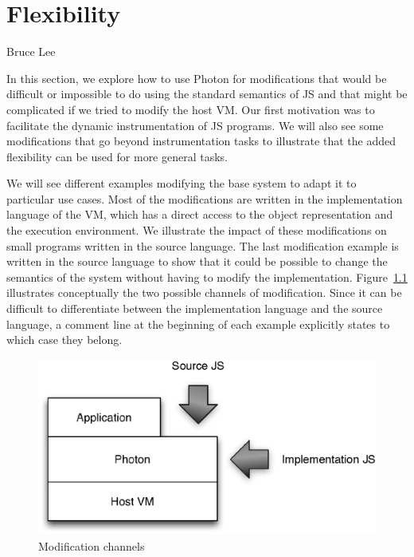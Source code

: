 \chapter{Flexibility}
\label{chap:Flexibility}

{Bruce Lee}

In this section, we explore how to use Photon for modifications that would be
difficult or impossible to do using the standard semantics of JS and that might
be complicated if we tried to modify the host VM. Our first motivation was to
facilitate the dynamic instrumentation of JS programs. We will also see some
modifications that go beyond instrumentation tasks to illustrate that the added
flexibility can be used for more general tasks.

We will see different examples modifying the base system to adapt it to
particular use cases. Most of the modifications are written in the
implementation language of the VM, which has a direct access to the object
representation and the execution environment. We illustrate the impact of these
modifications on small programs written in the source language. The last
modification example is written in the source language to show that it could be
possible to change the semantics of the system without having to modify the
implementation. Figure~\ref{fig:ModificationChannels} illustrates conceptually
the two possible channels of modification.  Since it can be difficult to
differentiate between the implementation language and the source language, a
comment line at the beginning of each example explicitly states to which case
they belong.

\begin{figure}[htb]
\begin{center}
\includegraphics{figures/modificationChannels}
\caption{\label{fig:ModificationChannels} Modification channels}
\end{center}
\end{figure}

